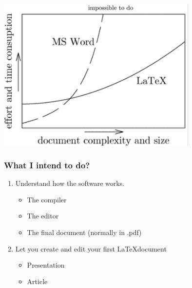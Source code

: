 \documentclass[10pt]{beamer}
\begin{document}
\begin{frame}
  

\begin{center}
  \includegraphics[width=0.75\textwidth]{latex-vs-word.png}
   \end{center}    



\end{frame}


\begin{frame}

  \frametitle{What I intend to do?}
 
  
 \begin{enumerate}
    \item Understand how the software works.
    
       \begin{itemize}
     \item The compiler
     \item The editor
     \item The final document (normally in .pdf)
      \end{itemize}
   
   \item Let you create and edit your first \LaTeX document
   
          \begin{itemize}
          \item Presentation
          \item Article
          
         
\end{itemize}
  \end{enumerate} 
 
  \end{frame}
  
\end{document}
